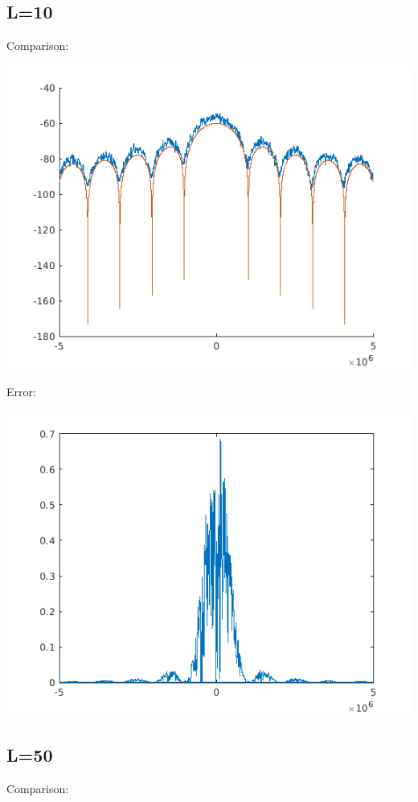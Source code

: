 \documentclass[conference,9pt]{IEEEtran}
\begin{document}
\subsection{L=10}
Comparison:

\includegraphics[scale=0.6]{barlett10.png}

Error:

\includegraphics[scale=0.6]{me10.png}

\subsection{L=50}
Comparison:
\end{document}
